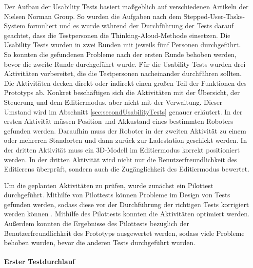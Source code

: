 Der Aufbau der Usability Tests basiert maßgeblich auf verschiedenen Artikeln der Nielsen Norman Group. So wurden die Aufgaben nach dem Stepped-User-Tasks-System \cite{Pernice.2020} formuliert und es wurde während der Durchführung der Tests darauf geachtet, dass die Testpersonen die Thinking-Aloud-Methode \cite{Nielsen.2012b} einsetzen. Die Usability Tests wurden in zwei Runden mit jeweils fünf Personen durchgeführt. So konnten die gefundenen Probleme nach der ersten Runde behoben werden, bevor die zweite Runde durchgeführt wurde. Für die Usability Tests wurden drei Aktivitäten vorbereitet, die die Testpersonen nacheinander durchführen sollten. Die Aktivitäten decken direkt oder indirekt einen großen Teil der Funktionen des Prototyps ab. Konkret beschäftigen sich die Aktivitäten mit der Übersicht, der Steuerung und dem Editiermodus, aber nicht mit der Verwaltung. Dieser Umstand wird im Abschnitt \ref{sec:secondUsabilityTests} genauer erläutert. In der ersten Aktivität müssen Position und Akkustand eines bestimmten Roboters gefunden werden. Daraufhin muss der Roboter in der zweiten Aktivität zu einem oder mehreren Standorten und dann zurück zur Ladestation geschickt werden. In der dritten Aktivität muss ein 3D-Modell im Editiermodus korrekt positioniert werden. In der dritten Aktivität wird nicht nur die Benutzerfreundlichkeit des Editierens überprüft, sondern auch die Zugänglichkeit des Editiermodus bewertet.

Um die geplanten Aktivitäten zu prüfen, wurde zunächst ein Pilottest durchgeführt. Mithilfe von Pilottests können Probleme im Design von Tests gefunden werden, sodass diese vor der Durchführung der richtigen Tests korrigiert werden können \cite{Schade.2015}. Mithilfe des Pilottests konnten die Aktivitäten optimiert werden. Außerdem konnten die Ergebnisse des Pilottests bezüglich der Benutzerfreundlichkeit des Prototyps ausgewertet werden, sodass viele Probleme behoben wurden, bevor die anderen Tests durchgeführt wurden.

\paragraph{Erster Testdurchlauf}

